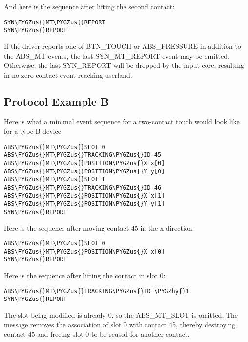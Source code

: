 \documentclass[a4paper,8pt,english]{sphinxmanual}
\def\PYGZus{\char`\_}
\def\PYGZhy{\char`\-}
\begin{document}
And here is the sequence after lifting the second contact:

\begin{Verbatim}[commandchars=\\\{\}]
SYN\PYGZus{}MT\PYGZus{}REPORT
SYN\PYGZus{}REPORT
\end{Verbatim}

If the driver reports one of BTN\_TOUCH or ABS\_PRESSURE in addition to the
ABS\_MT events, the last SYN\_MT\_REPORT event may be omitted. Otherwise, the
last SYN\_REPORT will be dropped by the input core, resulting in no
zero-contact event reaching userland.


\subsection{Protocol Example B}
\label{input/multi-touch-protocol:protocol-example-b}
Here is what a minimal event sequence for a two-contact touch would look
like for a type B device:

\begin{Verbatim}[commandchars=\\\{\}]
ABS\PYGZus{}MT\PYGZus{}SLOT 0
ABS\PYGZus{}MT\PYGZus{}TRACKING\PYGZus{}ID 45
ABS\PYGZus{}MT\PYGZus{}POSITION\PYGZus{}X x[0]
ABS\PYGZus{}MT\PYGZus{}POSITION\PYGZus{}Y y[0]
ABS\PYGZus{}MT\PYGZus{}SLOT 1
ABS\PYGZus{}MT\PYGZus{}TRACKING\PYGZus{}ID 46
ABS\PYGZus{}MT\PYGZus{}POSITION\PYGZus{}X x[1]
ABS\PYGZus{}MT\PYGZus{}POSITION\PYGZus{}Y y[1]
SYN\PYGZus{}REPORT
\end{Verbatim}

Here is the sequence after moving contact 45 in the x direction:

\begin{Verbatim}[commandchars=\\\{\}]
ABS\PYGZus{}MT\PYGZus{}SLOT 0
ABS\PYGZus{}MT\PYGZus{}POSITION\PYGZus{}X x[0]
SYN\PYGZus{}REPORT
\end{Verbatim}

Here is the sequence after lifting the contact in slot 0:

\begin{Verbatim}[commandchars=\\\{\}]
ABS\PYGZus{}MT\PYGZus{}TRACKING\PYGZus{}ID \PYGZhy{}1
SYN\PYGZus{}REPORT
\end{Verbatim}

The slot being modified is already 0, so the ABS\_MT\_SLOT is omitted.  The
message removes the association of slot 0 with contact 45, thereby
destroying contact 45 and freeing slot 0 to be reused for another contact.
\end{document}
